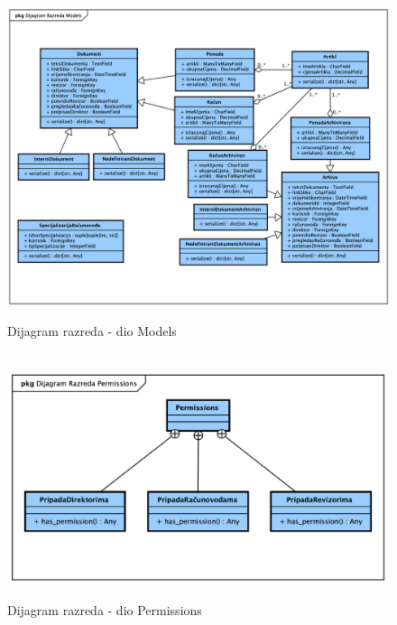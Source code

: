 			\begin{figure}[H]
				\
				\includegraphics[width=\textwidth]{slike/Class_Models.png}
				\caption{Dijagram razreda - dio Models}
				\label{fig:class_models}
			\end{figure}

			\begin{figure}[H]
				\
				\includegraphics[width=\textwidth]{slike/Class_Permissions.png}
				\caption{Dijagram razreda - dio Permissions}
				\label{fig:class_permissions}
			\end{figure}

